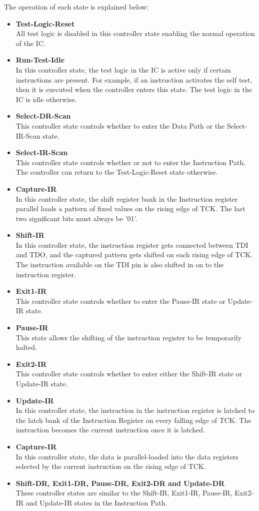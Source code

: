 \documentclass[a4paper,11pt]{article}
\begin{document}
The operation of each state is explained below:
\begin{itemize}[noitemsep]
\item \textbf{Test-Logic-Reset} \\All test logic is disabled in this controller state enabling the normal operation of the IC.
\item \textbf{Run-Test-Idle} \\In this controller state, the test logic in the IC is active only if certain instructions are present. For example, if an instruction activates the self test, then it is executed when the controller enters this state. The test logic in the IC is idle otherwise.
\item \textbf{Select-DR-Scan} \\This controller state controls whether to enter the Data Path or the Select-IR-Scan state.
\item \textbf{Select-IR-Scan} \\This controller state controls whether or not to enter the Instruction Path. The controller can return to the Test-Logic-Reset state otherwise.
\item \textbf{Capture-IR} \\In this controller state, the shift register bank in the Instruction register parallel loads a pattern of fixed values on the rising edge of TCK. The last two significant bits must always be '01'.
\item \textbf{Shift-IR} \\In this controller state, the instruction register gets connected between TDI and TDO, and the captured pattern gets shifted on each rising edge of TCK. The instruction available on the TDI pin is also shifted in on to the instruction register.
\item \textbf{Exit1-IR} \\This controller state controls whether to enter the Pause-IR state or Update-IR state.
\item \textbf{Pause-IR} \\This state allows the shifting of the instruction register to be temporarily halted.
\item \textbf{Exit2-IR} \\This controller state controls whether to enter either the Shift-IR state or Update-IR state.
\item \textbf{Update-IR} \\In this controller state, the instruction in the instruction register is latched to the latch bank of the Instruction Register on every falling edge of TCK. The instruction becomes the current instruction once it is latched.
\item \textbf{Capture-IR} \\In this controller state, the data is parallel-loaded into the data registers selected by the current instruction on the rising edge of TCK.
\item \textbf{Shift-DR, Exit1-DR, Pause-DR, Exit2-DR and Update-DR} \\These controller states are similar to the Shift-IR, Exit1-IR, Pause-IR, Exit2-IR and Update-IR states in the Instruction Path.
\end{itemize}
\end{document}
